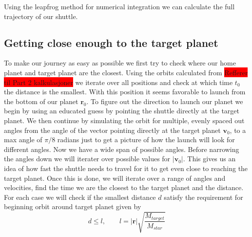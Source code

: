 \documentclass[reprint,english,notitlepage]{revtex4-2}
\begin{document}
Using the leapfrog method for numerical integration we can calculate the full trajectory of our shuttle.
\newline
\subsection{Getting close enough to the target planet}
To make our journey as easy as possible we first try to check where our home planet and target planet are the closest. Using the orbits calculated from \colorbox{red}{Refferer til Part 2 kalkulasjoner} we iterate over all positions and check at which time $ t_{0} $ the distance is the smallest. With this position it seems favorable to launch from the bottom of our planet $ \mathbf{r}_0 $. To figure out the direction to launch our planet we begin by using an educated guess by pointing the shuttle directly at the target planet. We then continue by simulating the orbit for multiple, evenly spaced out angles from the angle of the vector pointing directly at the target planet $ \mathbf{v}_0 $, to a max angle of $ π/8 $ radians just to get a picture of how the launch will look for different angles.  Now we have a wide span of possible angles. Before narrowing the angles down we will iterater over possible values for $ \left\vert \mathbf{v}_0 \right\vert  $. This gives us an idea of how fast the shuttle needs to travel for it to get even close to reaching the target planet. Once this is done, we will iterate over a range of angles and velocities, find the time we are the closest to the target planet and the distance. For each case we will check if the smallest distance $ d $ satisfy the requirement for beginning orbit around target planet given by 
\[
d \le l, \qquad l = \left\vert \mathbf{r} \right\vert \sqrt{\frac{M_{target}}{M_{star}}}  
\]
\end{document}
